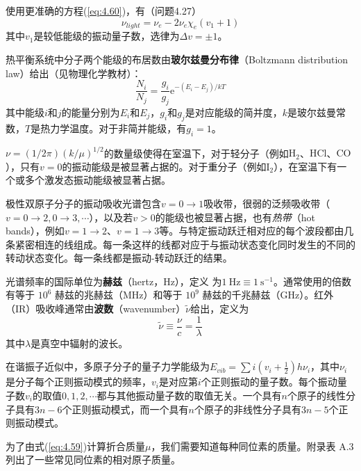     使用更准确的方程(\ref{eq:4.60})，有（问题4.27）
    \begin{equation}
        \nu_{light} = \nu_e - 2\nu_e\chi_e\left(v_1+1\right)
        \label{eq:4.62}
    \end{equation}
    其中$v_1$是较低能级的振动量子数，选律为$\Delta v = \pm 1$。

    热平衡系统中分子两个能级的布居数由\textbf{玻尔兹曼分布律}（Boltzmann distribution law）给出（见物理化学教材）：
    \begin{equation}
        \boxed{
            \frac{N_i}{N_j} = \frac{g_i}{g_j} \mathrm{e}^{-(E_i-E_j)/kT}
        }
        \label{eq:4.63}
    \end{equation}
    其中能级$i$和$j$的能量分别为$E_i$和$E_j$，$g_i$和$g_j$是对应能级的简并度，$k$是玻尔兹曼常数，$T$是热力学温度。对于非简并能级，有$g_i=1$。

    $\nu = \left(1/2\pi\right)\left(k/\mu\right)^{1/2}$的数量级使得在室温下，对于轻分子（例如$\mathrm{H}_2$、$\mathrm{HCl}$、$\mathrm{CO}$），只有$v=0$的振动能级是被显著占据的。对于重分子（例如$\mathrm{I}_2$），在室温下有一个或多个激发态振动能级被显著占据。

    极性双原子分子的振动吸收光谱包含$v= 0 \to 1$吸收带，很弱的泛频吸收带（$v = 0\to 2, 0 \to 3, \cdots$），以及若$v>0$的能级也被显著占据，也有\textit{热带}（hot bands），例如$v = 1 \to 2$、$v = 1 \to 3$等。与特定振动跃迁相对应的每个波段都由几条紧密相连的线组成。每一条这样的线都对应于与振动状态变化同时发生的不同的转动状态变化。每一条线都是振动-转动跃迁的结果。

    光谱频率的国际单位为\textbf{赫兹}（hertz，Hz），定义
    为$1 \:\mathrm{Hz} \equiv 1 \:\mathrm{s}^{-1}$。通常使用的倍数有等于 $10^6$ 赫兹的兆赫兹（MHz）和等于 $10^9$ 赫兹的千兆赫兹（GHz）。红外（IR）吸收峰通常由\textbf{波数}（wavenumber）$\tilde{\nu}$给出，定义为
    \begin{equation}
        \boxed{
            \tilde{\nu} \equiv \frac{\nu}{c} = \frac{1}{\lambda}
        }
        \label{eq:4.64}
    \end{equation}
    其中$\lambda$是真空中辐射的波长。

    在谐振子近似中，多原子分子的量子力学能级为$E_{vib} = \sum i\left(v_i+\frac{1}{2}\right)h\nu_i$，其中$\nu_i$是分子每个正则振动模式的频率，$v_i$是对应第$i$个正则振动的量子数。每个振动量子数$v_i$的取值$0,1,2,\cdots$都与其他振动量子数的取值无关。一个具有$n$个原子的线性分子具有$3n-6$个正则振动模式，而一个具有$n$个原子的非线性分子具有$3n-5$个正则振动模式。

    为了由式(\ref{eq:4.59})计算折合质量$\mu$，我们需要知道每种同位素的质量。附录表 A.3 列出了一些常见同位素的相对原子质量。

